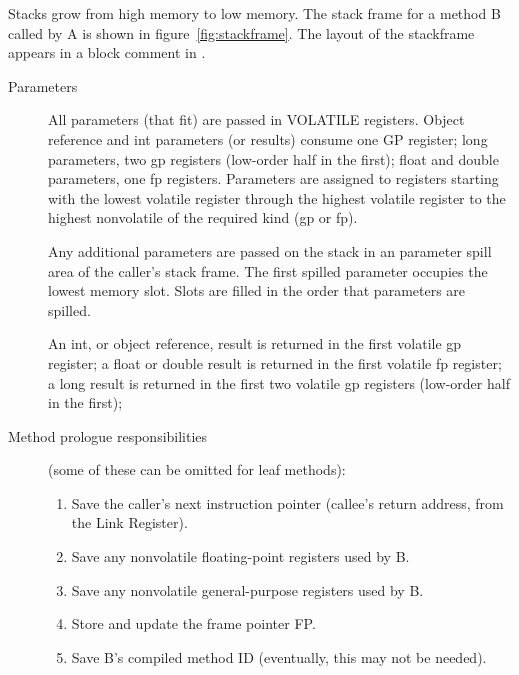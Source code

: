 
Stacks grow from high memory to low memory.  The stack frame for a method
B called by A is shown in figure~\ref{fig:stackframe}. 
The layout of the stackframe appears in a block comment in
{\PPCStackframeLayoutURL}.


\begin{description}
\item[Parameters]

    All parameters (that fit) are passed in VOLATILE registers.  Object
    reference and int parameters (or results) consume one GP register; long
    parameters, two gp registers (low-order half in the first);  float and
    double parameters, one fp registers.  Parameters are 
    assigned to registers
    starting with the lowest volatile register through the highest volatile
    register to the highest nonvolatile of the required kind (gp or fp).

    Any additional parameters are passed on the stack in an parameter spill
    area of the caller's stack frame.  The first spilled parameter occupies
    the lowest memory slot.  Slots are filled in the order that parameters
    are spilled.

    An int, or object reference, result is returned in the first volatile
    gp register; a float or double result is returned in the first volatile
    fp register; a long result is returned in the first two volatile gp
    registers (low-order half in the first);

\item [Method prologue responsibilities] (some of these can be omitted for leaf
  methods):

\begin{enumerate}
\item Save the caller's next instruction pointer (callee's return address,
       from the Link Register).

\item Save any nonvolatile floating-point registers used by B.

\item Save any nonvolatile general-purpose registers used by B.

\item Store and update the frame pointer FP.

\item Save B's compiled method ID (eventually, this may not be needed).


\end{enumerate}
\end{description}
